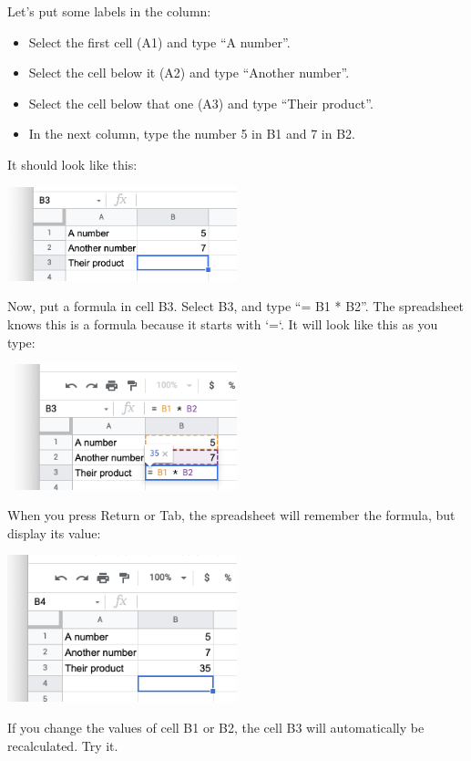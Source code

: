 Let's put some labels in the column:
\begin{itemize}
\item Select the first cell (A1) and type ``A number''.
\item Select the cell below it (A2) and type ``Another number''.
\item Select the cell below that one (A3) and type ``Their product''.
\item In the next column, type the number 5 in B1 and 7 in B2.
\end{itemize}

It should look like this:

\includegraphics[width=0.5\textwidth]{NoFormulas.png}

Now, put a formula in cell B3. Select B3, and type ``= B1 * B2''. The spreadsheet knows this is a formula because it starts with `=`. It will look like this as you type:

\includegraphics[width=0.5\textwidth]{TypingFirstFormula.png}

When you press Return or Tab, the spreadsheet will remember the formula, but display its value:

\includegraphics[width=0.5\textwidth]{FirstCalc.png}

If you change the values of cell B1 or B2, the cell B3 will automatically be recalculated. Try it.

